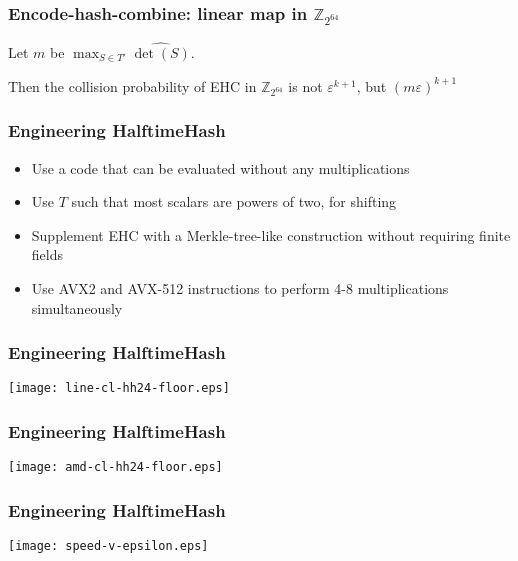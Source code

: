 \documentclass[xcolor=dvipsnames]{beamer}
\begin{document}
\begin{frame}

  \frametitle{Encode-hash-combine: linear map \textbf{ in $\mathbb{Z}_{2^{64}}$}}

  Let $m$ be $\max_{S \in T'} \widehat{\det(S)}$.
  \pause

  $ $ \\
  Then the collision probability of EHC in $\mathbb{Z}_{2^{64}}$ is not $\varepsilon^{k+1}$, but $(m \varepsilon)^{k+1}$
\end{frame}


\begin{frame}

  \frametitle{Engineering HalftimeHash}
  \pause
  \begin{itemize}
  \item Use a code that can be evaluated without any multiplications
  \pause
  \item Use $T$ such that most scalars are powers of two, for shifting
  \pause
  \item Supplement EHC with a Merkle-tree-like construction without requiring finite fields
  \pause
  \item Use AVX2 and AVX-512 instructions to perform 4-8 multiplications simultaneously
  \end{itemize}
\end{frame}

\begin{frame}
  \frametitle{Engineering HalftimeHash}
  \begin{center}
    \texttt{[image: line-cl-hh24-floor.eps]}
  \end{center}
\end{frame}

\begin{frame}
  \frametitle{Engineering HalftimeHash}
  \begin{center}
    \texttt{[image: amd-cl-hh24-floor.eps]}
  \end{center}
\end{frame}

\begin{frame}
  \frametitle{Engineering HalftimeHash}
  \begin{center}
    \texttt{[image: speed-v-epsilon.eps]}
  \end{center}
\end{frame}
\end{document}
